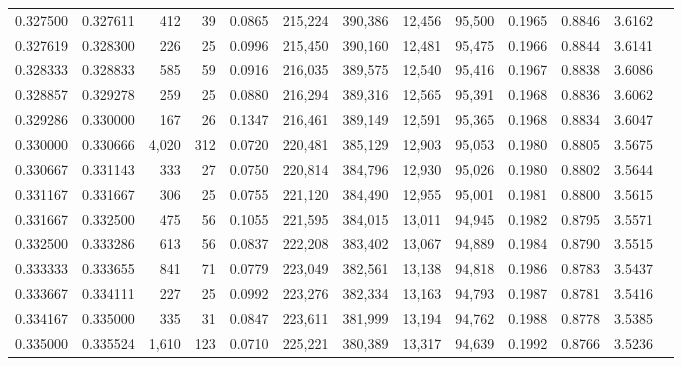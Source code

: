 \begin{tabular}{rrrrrrrrrrrrr}
0.327500 & 0.327611 &   412 &  39 &                                     0.0865 & 215,224 & 390,386 &  12,456 &  95,500 & 0.1965 & 0.8846 & 3.6162 \\
0.327619 & 0.328300 &   226 &  25 &                                     0.0996 & 215,450 & 390,160 &  12,481 &  95,475 & 0.1966 & 0.8844 & 3.6141 \\
0.328333 & 0.328833 &   585 &  59 &                                     0.0916 & 216,035 & 389,575 &  12,540 &  95,416 & 0.1967 & 0.8838 & 3.6086 \\
0.328857 & 0.329278 &   259 &  25 &                                     0.0880 & 216,294 & 389,316 &  12,565 &  95,391 & 0.1968 & 0.8836 & 3.6062 \\
0.329286 & 0.330000 &   167 &  26 &                                     0.1347 & 216,461 & 389,149 &  12,591 &  95,365 & 0.1968 & 0.8834 & 3.6047 \\
0.330000 & 0.330666 & 4,020 & 312 &                                     0.0720 & 220,481 & 385,129 &  12,903 &  95,053 & 0.1980 & 0.8805 & 3.5675 \\
0.330667 & 0.331143 &   333 &  27 &                                     0.0750 & 220,814 & 384,796 &  12,930 &  95,026 & 0.1980 & 0.8802 & 3.5644 \\
0.331167 & 0.331667 &   306 &  25 &                                     0.0755 & 221,120 & 384,490 &  12,955 &  95,001 & 0.1981 & 0.8800 & 3.5615 \\
0.331667 & 0.332500 &   475 &  56 &                                     0.1055 & 221,595 & 384,015 &  13,011 &  94,945 & 0.1982 & 0.8795 & 3.5571 \\
0.332500 & 0.333286 &   613 &  56 &                                     0.0837 & 222,208 & 383,402 &  13,067 &  94,889 & 0.1984 & 0.8790 & 3.5515 \\
0.333333 & 0.333655 &   841 &  71 &                                     0.0779 & 223,049 & 382,561 &  13,138 &  94,818 & 0.1986 & 0.8783 & 3.5437 \\
0.333667 & 0.334111 &   227 &  25 &                                     0.0992 & 223,276 & 382,334 &  13,163 &  94,793 & 0.1987 & 0.8781 & 3.5416 \\
0.334167 & 0.335000 &   335 &  31 &                                     0.0847 & 223,611 & 381,999 &  13,194 &  94,762 & 0.1988 & 0.8778 & 3.5385 \\
0.335000 & 0.335524 & 1,610 & 123 &                                     0.0710 & 225,221 & 380,389 &  13,317 &  94,639 & 0.1992 & 0.8766 & 3.5236 \\

\end{tabular}
